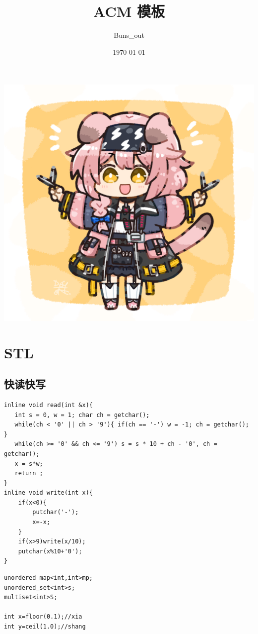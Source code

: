 \documentclass[12pt, a4paper, oneside]{ctexart}
\title{\fontsize{70}{30}\selectfont  ACM 模板}
\author{Buns\_out}
\date{\today}
\begin{document}
 



\maketitle
\thispagestyle{empty}
\centering
\includegraphics[scale=1.3]{1.png}



\newpage
\tableofcontents 
\thispagestyle{empty}
\lstset{language=C++}


\newpage 
\section{STL} 
\subsection{快读快写}
\begin{lstlisting}
inline void read(int &x){
   int s = 0, w = 1; char ch = getchar();
   while(ch < '0' || ch > '9'){ if(ch == '-') w = -1; ch = getchar(); }
   while(ch >= '0' && ch <= '9') s = s * 10 + ch - '0', ch = getchar();
   x = s*w;
   return ;
}
inline void write(int x){
    if(x<0){
    	putchar('-');
		x=-x;
	}
    if(x>9)write(x/10);
    putchar(x%10+'0');
}  
\end{lstlisting}
\begin{lstlisting}
unordered_map<int,int>mp;
unordered_set<int>s;
multiset<int>S;

int x=floor(0.1);//xia
int y=ceil(1.0);//shang
\end{lstlisting}
\end{document}

